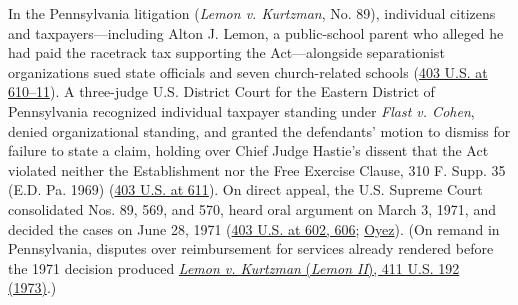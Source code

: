 \documentclass[12pt]{article}
\begin{document}
In the Pennsylvania litigation (\textit{Lemon v. Kurtzman}, No. 89), individual citizens and taxpayers---including Alton J. Lemon, a public-school parent who alleged he had paid the racetrack tax supporting the Act---alongside separationist organizations sued state officials and seven church-related schools (\href{https://supreme.justia.com/cases/federal/us/403/602/}{403 U.S. at 610--11}). A three-judge U.S. District Court for the Eastern District of Pennsylvania recognized individual taxpayer standing under \textit{Flast v. Cohen}, denied organizational standing, and granted the defendants' motion to dismiss for failure to state a claim, holding over Chief Judge Hastie's dissent that the Act violated neither the Establishment nor the Free Exercise Clause, 310 F. Supp. 35 (E.D. Pa. 1969) (\href{https://supreme.justia.com/cases/federal/us/403/602/}{403 U.S. at 611}). On direct appeal, the U.S. Supreme Court consolidated Nos. 89, 569, and 570, heard oral argument on March 3, 1971, and decided the cases on June 28, 1971 (\href{https://supreme.justia.com/cases/federal/us/403/602/}{403 U.S. at 602, 606}; \href{https://www.oyez.org/cases/1970/89}{Oyez}). (On remand in Pennsylvania, disputes over reimbursement for services already rendered before the 1971 decision produced \href{https://supreme.justia.com/cases/federal/us/411/192/}{\textit{Lemon v. Kurtzman} (\textit{Lemon II}), 411 U.S. 192 (1973)}.)
\end{document}

